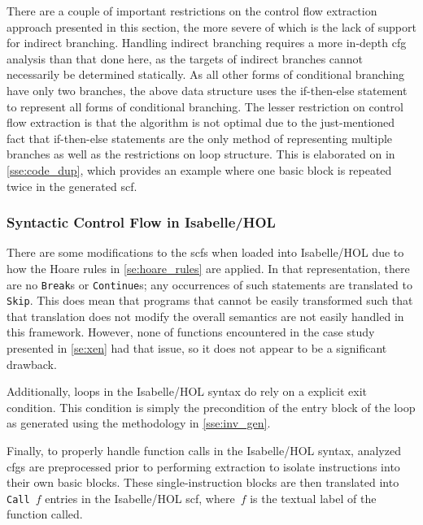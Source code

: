 There are a couple of important restrictions on the control flow extraction approach
presented in this section,
the more severe of which is the lack of support for indirect branching.
Handling indirect branching requires a more in-depth \ac{cfg} analysis
than that done here,
as the targets of indirect branches cannot necessarily be determined statically.
As all other forms of conditional branching have only two branches,
the above data structure uses the if-then-else statement to represent all forms of
conditional branching.
The lesser restriction on control flow extraction is that the algorithm is not optimal
due to the just-mentioned fact that if-then-else statements
are the only method of representing multiple branches
as well as the restrictions on loop structure.
This is elaborated on in \cref{sse:code_dup},
which provides an example where one basic block is repeated twice
in the generated \ac{scf}.

\subsubsection{Syntactic Control Flow in Isabelle/HOL}
There are some modifications to the \acp{scf} when loaded into Isabelle/HOL%
due to how the Hoare rules in \cref{se:hoare_rules} are applied.
In that representation, there are no \texttt{Break}s or \texttt{Continue}s;
any occurrences of such statements are translated to \texttt{Skip}.
This does mean that programs that cannot be easily transformed
such that that translation does not modify the overall semantics
are not easily handled in this framework.
However, none of functions encountered in the case study presented in \cref{se:xen}
had that issue, so it does not appear to be a significant drawback.

Additionally, loops in the Isabelle/HOL syntax do rely on a explicit exit condition.%
This condition is simply the precondition of the entry block of the loop%
as generated using the methodology in \cref{sse:inv_gen}.

Finally, to properly handle function calls in the Isabelle/HOL syntax,
analyzed \acp{cfg} are preprocessed prior to performing extraction
to isolate  instructions into their own basic blocks.%
These single-instruction blocks are then translated into \texttt{Call}~$f$ entries
in the Isabelle/HOL \ac{scf}, where~$f$ is the textual label of the function called.

